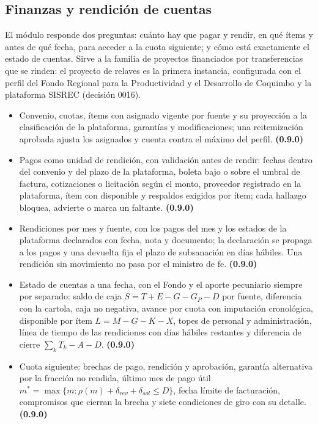 \documentclass[11pt,a4paper]{article}
\begin{document}
\subsection{Finanzas y rendición de cuentas}
\label{sec:finanzas}

El módulo responde dos preguntas: cuánto hay que pagar y rendir, en qué ítems y antes de qué fecha, para acceder a la cuota siguiente; y cómo está exactamente el estado de cuentas. Sirve a la familia de proyectos financiados por transferencias que se rinden: el proyecto de relaves es la primera instancia, configurada con el perfil del Fondo Regional para la Productividad y el Desarrollo de Coquimbo y la plataforma SISREC (decisión 0016).

\begin{itemize}
\item Convenio, cuotas, ítems con asignado vigente por fuente y su proyección a la clasificación de la plataforma, garantías y modificaciones; una reitemización aprobada ajusta los asignados y cuenta contra el máximo del perfil. \textbf{(0.9.0)}
\item Pagos como unidad de rendición, con validación antes de rendir: fechas dentro del convenio y del plazo de la plataforma, boleta bajo o sobre el umbral de factura, cotizaciones o licitación según el monto, proveedor registrado en la plataforma, ítem con disponible y respaldos exigidos por ítem; cada hallazgo bloquea, advierte o marca un faltante. \textbf{(0.9.0)}
\item Rendiciones por mes y fuente, con los pagos del mes y los estados de la plataforma declarados con fecha, nota y documento; la declaración se propaga a los pagos y una devuelta fija el plazo de subsanación en días hábiles. Una rendición sin movimiento no pasa por el ministro de fe. \textbf{(0.9.0)}
\item Estado de cuentas a una fecha, con el Fondo y el aporte pecuniario siempre por separado: saldo de caja $S=T+E-G-G_P-D$ por fuente, diferencia con la cartola, caja no negativa, avance por cuota con imputación cronológica, disponible por ítem $L=M-G-K-X$, topes de personal y administración, línea de tiempo de las rendiciones con días hábiles restantes y diferencia de cierre $\sum_k T_k-A-D$. \textbf{(0.9.0)}
\item Cuota siguiente: brechas de pago, rendición y aprobación, garantía alternativa por la fracción no rendida, último mes de pago útil $m^*=\max\{m:\rho(m)+\delta_{rev}+\delta_{sol}\le D\}$, fecha límite de facturación, compromisos que cierran la brecha y siete condiciones de giro con su detalle. \textbf{(0.9.0)}

\end{itemize}
\end{document}
